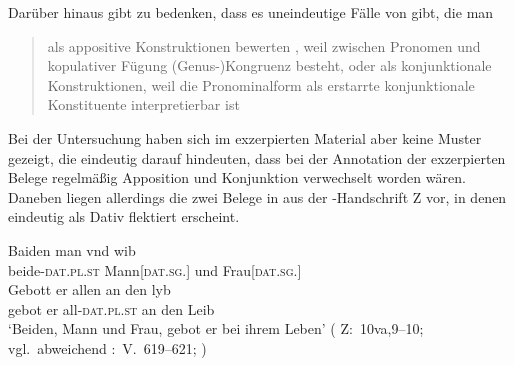 Darüber hinaus gibt \citet{gjelsten1980} zu bedenken, dass es
uneindeutige Fälle von  gibt, die man
\blockcquote[187]{gjelsten1980}{als appositive Konstruktionen
bewerten , weil zwischen Pronomen und kopulativer Fügung
(Genus-)Kongruenz besteht, oder als konjunktionale
Konstruktionen, weil die Pronominalform als erstarrte konjunktionale
Konstituente interpretierbar ist}.

Bei der Untersuchung haben sich im exzerpierten Material aber keine Muster
gezeigt, die eindeutig darauf hindeuten, dass bei der Annotation der
exzerpierten Belege regelmäßig Apposition und Konjunktion
verwechselt worden wären. Daneben liegen allerdings die zwei Belege in
 aus der \KC{}-Handschrift Z vor, in denen
 eindeutig als Dativ flektiert erscheint.

\begin{exe}
\ex \label{ex:kczbeidenundesynt1}
\begin{xlist}
	\ex \label{ex:kczbeidenundesynt1_1}
		\gll Baiden man vnd wib \\
			beide-\textsc{dat.pl\subMF.st} Mann[\textsc{dat.sg.\MascM}] und
				Frau[\textsc{dat.sg.\NeutF}] \\
	\sn \gll Gebott er allen an den lyb \\
			gebot er all-\textsc{dat.pl\subMF.st} an den Leib \\
		\trans `Beiden, Mann und Frau, gebot er bei ihrem Leben'
			(%
				Z:~10va,9--10; vgl.~abweichend
				\KC:~V.~619--621;
				\cite[92]{schroeder1895}%
			)

\end{xlist}
\end{exe}


